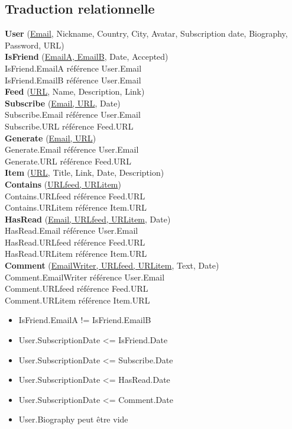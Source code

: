 \documentclass[11pt]{article}
\begin{document}
\subsection{Traduction relationnelle}
\noindent \textbf{User} (\underline{Email}, Nickname, Country, City, Avatar, Subscription date, Biography, Password, URL) \\
 \newline
\textbf{IsFriend} (\underline{EmailA, EmailB}, Date, Accepted) \\
	IsFriend.EmailA référence User.Email \\
	IsFriend.EmailB référence User.Email \\
\newline
\textbf{Feed} (\underline{URL}, Name, Description, Link) \\
\newline
\textbf{Subscribe} (\underline{Email, URL}, Date) \\
	Subscribe.Email référence User.Email \\
	Subscribe.URL référence Feed.URL \\
\newline
\textbf{Generate} (\underline{Email, URL}) \\
	Generate.Email référence User.Email \\
	Generate.URL référence Feed.URL \\
\newline
\textbf{Item} (\underline{URL}, Title, Link, Date, Description) \\
\newline
\textbf{Contains} (\underline{URLfeed, URLitem}) \\
	Contains.URLfeed référence Feed.URL \\
	Contains.URLitem référence Item.URL \\
\newline
\textbf{HasRead} (\underline{Email, URLfeed, URLitem}, Date) \\
	HasRead.Email référence User.Email \\
	HasRead.URLfeed référence Feed.URL \\
	HasRead.URLitem référence Item.URL \\
\newline
\textbf{Comment} (\underline{EmailWriter, URLfeed, URLitem}, Text, Date) \\
	Comment.EmailWriter référence User.Email \\
	Comment.URLfeed référence Feed.URL \\
	Comment.URLitem référence Item.URL \\
\begin{itemize}
\item{IsFriend.EmailA != IsFriend.EmailB}
\item{User.SubscriptionDate <= IsFriend.Date}
\item{User.SubscriptionDate <= Subscribe.Date}
\item{User.SubscriptionDate <= HasRead.Date}
\item{User.SubscriptionDate <= Comment.Date}
\item{User.Biography peut être vide}
\end{itemize}
\end{document}
